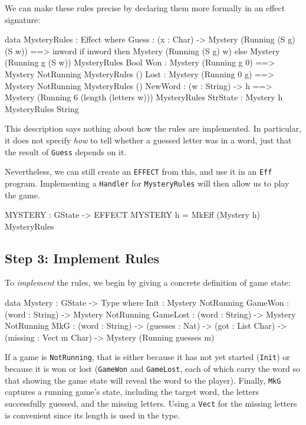 \noindent
We can make these rules precise by declaring them more formally in an
effect signature:

\begin{code}
data MysteryRules : Effect where
     Guess : (x : Char) ->
             { Mystery (Running (S g) (S w)) ==>
               {inword} if inword then Mystery (Running (S g) w)
                                  else Mystery (Running g (S w)) }
                MysteryRules Bool
     Won  : { Mystery (Running g 0) ==> Mystery NotRunning } MysteryRules ()
     Lost : { Mystery (Running 0 g) ==> Mystery NotRunning } MysteryRules ()
     NewWord : (w : String) ->
               { h ==> Mystery (Running 6 (length (letters w))) } MysteryRules
     StrState : { Mystery h } MysteryRules String
\end{code}

\noindent
This description says nothing about how the rules are implemented. In particular,
it does not specify \emph{how} to tell whether a guessed letter was in a word,
just that the result of \texttt{Guess} depends on it.

Nevertheless, we can still create an \texttt{EFFECT} from this, and use it
in an \texttt{Eff} program. Implementing a \texttt{Handler} for
\texttt{MysteryRules} will then allow us to play the game.

\begin{code}
MYSTERY : GState -> EFFECT
MYSTERY h = MkEff (Mystery h) MysteryRules
\end{code}

\subsection{Step 3: Implement Rules}

To \emph{implement} the rules, we begin by giving a concrete definition of
game state:

\begin{code}
data Mystery : GState -> Type where
     Init     : Mystery NotRunning 
     GameWon  : (word : String) -> Mystery NotRunning
     GameLost : (word : String) -> Mystery NotRunning
     MkG      : (word : String) ->
                (guesses : Nat) ->
                (got : List Char) ->
                (missing : Vect m Char) ->
                Mystery (Running guesses m)
\end{code}

\noindent
If a game is \texttt{NotRunning}, that is either because it
has not yet started (\texttt{Init}) or because it is won or lost (\texttt{GameWon}
and \texttt{GameLost}, each of which carry the word so that showing the game
state will reveal the word to the player). Finally, \texttt{MkG} captures a 
running game's state, including the target word, the letters successfully
guessed, and the missing letters. Using a \texttt{Vect} for the missing
letters is convenient since its length is used in the type.

